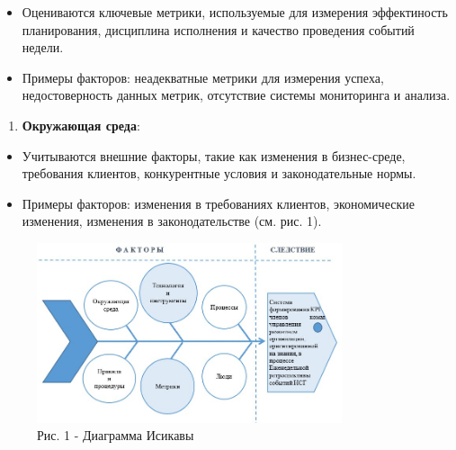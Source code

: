 \begin{multicols}{2}
\begin{itemize}
\item
  Оцениваются ключевые метрики, используемые для измерения эффектиность
  планирования, дисциплина исполнения и качество проведения событий
  недели.
\item
  Примеры факторов: неадекватные метрики для измерения успеха,
  недостоверность данных метрик, отсутствие системы мониторинга и
  анализа.
\end{itemize}

\begin{enumerate}
\def\labelenumi{\arabic{enumi}.}
\setcounter{enumi}{5}
\item
  {\bfseries Окружающая среда}:
\end{enumerate}

\begin{itemize}
\item
  Учитываются внешние факторы, такие как изменения в бизнес-среде,
  требования клиентов, конкурентные условия и законодательные нормы.
\item
  Примеры факторов: изменения в требованиях клиентов, экономические
  изменения, изменения в законодательстве (см. рис. 1).
\end{itemize}
\end{multicols}

\begin{figure}[H]
	\centering
	\includegraphics[width=0.8\textwidth]{media/ekon/image3.1}
	\caption*{Рис. 1 - Диаграмма Исикавы}
\end{figure}


